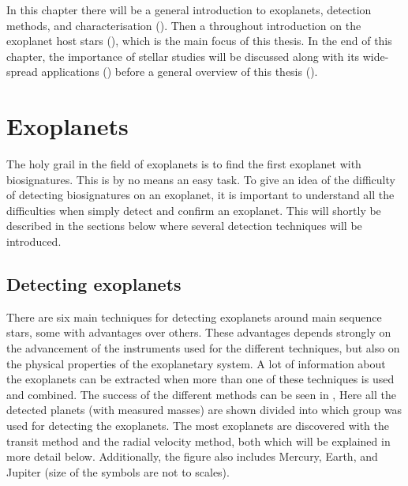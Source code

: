 In this chapter there will be a general introduction to exoplanets, detection methods, and
characterisation (). Then a throughout introduction on the exoplanet host stars
(), which is the main focus of this thesis. In the end of this chapter,
the importance of stellar studies will be discussed along with its wide-spread applications
() before a general overview of this thesis ().



\section{Exoplanets}
\label{sec:exoplanets}

The holy grail in the field of exoplanets is to find the first exoplanet with biosignatures. This is
by no means an easy task. To give an idea of the difficulty of detecting biosignatures on an
exoplanet, it is important to understand all the difficulties when simply detect and confirm an
exoplanet. This will shortly be described in the sections below where several detection techniques
will be introduced.

\subsection{Detecting exoplanets}
\label{sec:detecting_exoplanets}

There are six main techniques for detecting exoplanets around main sequence stars, some with
advantages over others. These advantages depends strongly on the advancement of the instruments used
for the different techniques, but also on the physical properties of the exoplanetary system. A lot
of information about the exoplanets can be extracted when more than one of these techniques is used
and combined. The success of the different methods can be seen in , Here
all the detected planets (with measured masses) are shown divided into which group was used for
detecting the exoplanets. The most exoplanets are discovered with the transit method and the radial
velocity method, both which will be explained in more detail below. Additionally, the figure also
includes Mercury, Earth, and Jupiter (size of the symbols are not to scales).

